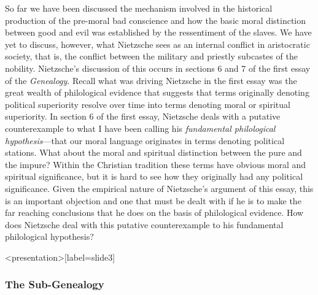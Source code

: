 So far we have been discussed the mechanism involved in the historical production of the pre-moral bad conscience and how the basic moral distinction between good and evil was established by the ressentiment of the slaves. We have yet to discuss, however, what Nietzsche sees as an internal conflict in aristocratic society, that is, the conflict between the military and priestly subcastes of the nobility. Nietzsche's discussion of this occurs in sections 6 and 7 of the first essay of the \emph{Genealogy}. Recall what was driving Nietzsche in the first essay was the great wealth of philological evidence that suggests that terms originally denoting political superiority resolve over time into terms denoting moral or spiritual superiority. In section 6 of the first essay, Nietzsche deals with a putative counterexample to what I have been calling his \emph{fundamental philological hypothesis}---that our moral language originates in terms denoting political stations. What about the moral and spiritual distinction between the pure and the impure? Within the Christian tradition these terms have obvious moral and spiritual significance, but it is hard to see how they originally had any political significance. Given the empirical nature of Nietzsche's argument of this essay, this is an important objection and one that must be dealt with if he is to make the far reaching conclusions that he does on the basis of philological evidence. How does Nietzsche deal with this putative counterexample to his fundamental philological hypothesis? \change

\begin{frame}<presentation>[label=slide3]
    \frametitle{The Sub-Genealogy}
\end{frame}

